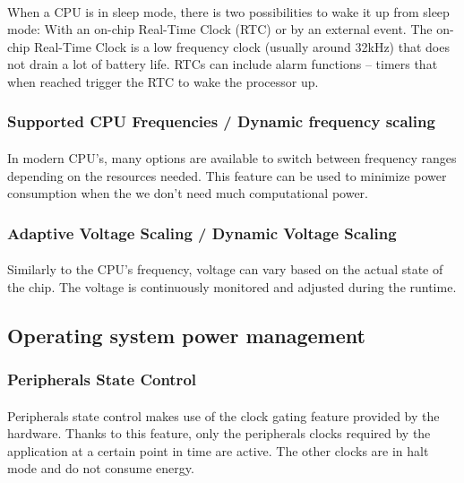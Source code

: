 \paragraph{}
When a CPU is in sleep mode, there is two possibilities to wake it up from sleep mode: %
With an on-chip Real-Time Clock (RTC) or by an external event.
The on-chip Real-Time Clock is a low frequency clock (usually around 32kHz) that does not drain a lot of battery life.
RTCs can include alarm functions – timers that when reached trigger the RTC to wake the processor up.

\subsubsection{Supported CPU Frequencies / Dynamic frequency scaling}
\paragraph{}
In modern CPU's, many options are available to switch between frequency ranges depending on the resources needed.
This feature can be used to minimize power consumption when the we don't need much computational power.

\subsubsection{Adaptive Voltage Scaling / Dynamic Voltage Scaling}
\paragraph{}
Similarly to the CPU's frequency, voltage can vary based on the actual state of the chip.
The voltage is continuously monitored and adjusted during the runtime.


\subsection{Operating system power management}

\subsubsection{Peripherals State Control}
\paragraph{}
Peripherals state control makes use of the clock gating feature provided by the hardware.
Thanks to this feature, only the peripherals clocks required by the application at a certain point in time are active.
The other clocks are in halt mode and do not consume energy.

